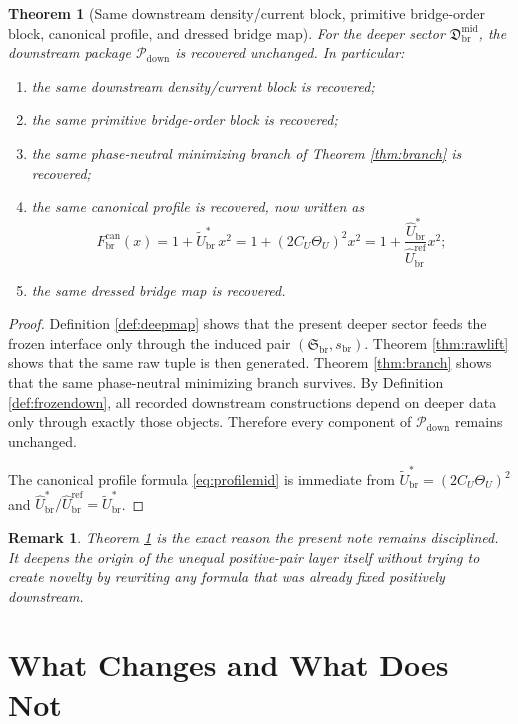\documentclass[11pt]{article}
\newcommand{\RespShapeEq}{\widetilde U_{\mathrm{br}}^{\ast}}
\newcommand{\RespRawRef}{\widehat U_{\mathrm{br}}^{\mathrm{ref}}}
\newcommand{\RespRawEq}{\widehat U_{\mathrm{br}}^{\ast}}
\newcommand{\CurvProfileCan}{F_{\mathrm{br}}^{\mathrm{can}}}
\newcommand{\DownPkg}{\mathscr P_{\mathrm{down}}}
\newcommand{\ShapeTuple}{\mathfrak S_{\mathrm{br}}}
\newcommand{\ScaleMod}{s_{\mathrm{br}}}
\newcommand{\MidFiberSector}{\mathfrak D_{\mathrm{br}}^{\mathrm{mid}}}
\newcommand{\MidEq}{C_{U}}
\newcommand{\FiberEq}{\Theta_{U}}
\newtheorem{remark}{Remark}
\newtheorem{theorem}{Theorem}
\begin{document}
\begin{theorem}[Same downstream density/current block, primitive bridge-order block, canonical profile, and dressed bridge map]
\label{thm:downstream}
For the deeper sector \(\MidFiberSector\), the downstream package \(\DownPkg\) is recovered unchanged. In particular:
\begin{enumerate}
    \item the same downstream density/current block is recovered;
    \item the same primitive bridge-order block is recovered;
    \item the same phase-neutral minimizing branch of Theorem \ref{thm:branch} is recovered;
    \item the same canonical profile is recovered, now written as
    \begin{equation}
    \CurvProfileCan(x)
    =
    1+\RespShapeEq\,x^{2}
    =
    1+(2\MidEq\FiberEq)^{2}x^{2}
    =
    1+\frac{\RespRawEq}{\RespRawRef}x^{2};
    \label{eq:profilemid}
    \end{equation}
    \item the same dressed bridge map is recovered.
\end{enumerate}
\end{theorem}

\begin{proof}
Definition \ref{def:deepmap} shows that the present deeper sector feeds the frozen interface only through the induced pair \((\ShapeTuple,\ScaleMod)\). Theorem \ref{thm:rawlift} shows that the same raw tuple is then generated. Theorem \ref{thm:branch} shows that the same phase-neutral minimizing branch survives. By Definition \ref{def:frozendown}, all recorded downstream constructions depend on deeper data only through exactly those objects. Therefore every component of \(\DownPkg\) remains unchanged.

The canonical profile formula \eqref{eq:profilemid} is immediate from \(\RespShapeEq=(2\MidEq\FiberEq)^{2}\) and \(\RespRawEq/\RespRawRef=\RespShapeEq\).
\end{proof}

\begin{remark}
Theorem \ref{thm:downstream} is the exact reason the present note remains disciplined. It deepens the origin of the unequal positive-pair layer itself without trying to create novelty by rewriting any formula that was already fixed positively downstream.
\end{remark}

\section{What Changes and What Does Not}
\end{document}
